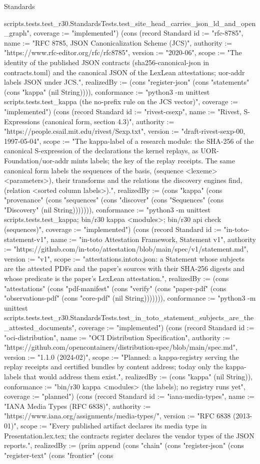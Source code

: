 \begin{lexlean}{Standards}
\begin{semanticmodule}
{scripts.tests.test_r30.StandardsTests.test_site_head_carries_json_ld_and_open_graph", coverage := "implemented"}) (cons (record Standard {id := "rfc-8785", name := "RFC 8785, JSON Canonicalization Scheme (JCS)", authority := "https://www.rfc-editor.org/rfc/rfc8785", version := "2020-06", scope := "The identity of the published JSON contracts (sha256-canonical-json in contracts.toml) and the canonical JSON of the LexLean attestations; uor-addr labels JSON under JCS.", realizedBy := (cons "register-json" (cons "statements" (cons "kappa" (nil String)))), conformance := "python3 -m unittest scripts.tests.test_kappa (the no-prefix rule on the JCS vector)", coverage := "implemented"}) (cons (record Standard {id := "rivest-csexp", name := "Rivest, S-Expressions (canonical form, section 4.3)", authority := "https://people.csail.mit.edu/rivest/Sexp.txt", version := "draft-rivest-sexp-00, 1997-05-04", scope := "The kappa-label of a research module: the SHA-256 of the canonical S-expression of the declarations the kernel replays, as UOR-Foundation/uor-addr mints labels; the key of the replay receipts. The same canonical form labels the sequences of the basis, (sequence <lexeme> <parameters>), their transforms and the relations the discovery engines find, (relation <sorted column labels>).", realizedBy := (cons "kappa" (cons "provenance" (cons "sequences" (cons "discover" (cons "Sequences" (cons "Discovery" (nil String))))))), conformance := "python3 -m unittest scripts.tests.test_kappa; bin/r30 kappa <modules>; bin/r30 api check (sequences)", coverage := "implemented"}) (cons (record Standard {id := "in-toto-statement-v1", name := "in-toto Attestation Framework, Statement v1", authority := "https://github.com/in-toto/attestation/blob/main/spec/v1/statement.md", version := "v1", scope := "attestations.intoto.json: a Statement whose subjects are the attested PDFs and the paper's sources with their SHA-256 digests and whose predicate is the paper's LexLean attestation.", realizedBy := (cons "attestations" (cons "pdf-manifest" (cons "verify" (cons "paper-pdf" (cons "observations-pdf" (cons "core-pdf" (nil String))))))), conformance := "python3 -m unittest scripts.tests.test_r30.StandardsTests.test_in_toto_statement_subjects_are_the_attested_documents", coverage := "implemented"}) (cons (record Standard {id := "oci-distribution", name := "OCI Distribution Specification", authority := "https://github.com/opencontainers/distribution-spec/blob/main/spec.md", version := "1.1.0 (2024-02)", scope := "Planned: a kappa-registry serving the replay receipts and certified bundles by content address; today only the kappa-labels that would address them exist.", realizedBy := (cons "kappa" (nil String)), conformance := "bin/r30 kappa <modules> (the labels); no registry runs yet", coverage := "planned"}) (cons (record Standard {id := "iana-media-types", name := "IANA Media Types (RFC 6838)", authority := "https://www.iana.org/assignments/media-types/", version := "RFC 6838 (2013-01)", scope := "Every published artifact declares its media type in Presentation.lex.tex; the contracts register declares the vendor types of the JSON reports.", realizedBy := (prim append (cons "chain" (cons "register-json" (cons "register-text" (cons "frontier" (cons }
\end{semanticmodule}
\end{lexlean}
